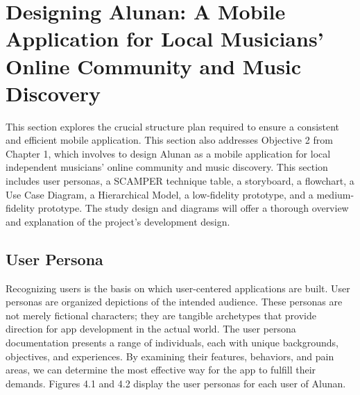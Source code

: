 
\section{Designing Alunan: A Mobile Application for Local Musicians’ Online Community and Music Discovery}
This section explores the crucial structure plan required to ensure a consistent and efficient mobile application. This section also addresses Objective 2 from Chapter 1, which involves to design Alunan as a mobile application for local independent musicians’ online community and music discovery. This section includes user personas, a SCAMPER technique table, a storyboard, a flowchart, a Use Case Diagram, a Hierarchical Model, a low-fidelity prototype, and a medium-fidelity prototype. The study design and diagrams will offer a thorough overview and explanation of the project's development design.

\subsection{User Persona}
Recognizing users is the basis on which user-centered applications are built. User personas are organized depictions of the intended audience. These personas are not merely fictional characters; they are tangible archetypes that provide direction for app development in the actual world. The user persona documentation presents a range of individuals, each with unique backgrounds, objectives, and experiences. By examining their features, behaviors, and pain areas, we can determine the most effective way for the app to fulfill their demands. Figures 4.1 and 4.2 display the user personas for each user of Alunan. \\

